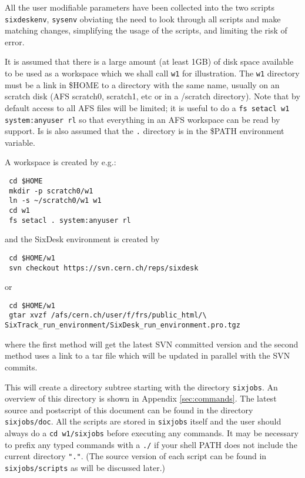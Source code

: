 \documentclass{article}    %
\begin{document}
All the user modifiable parameters have been collected into the two scripts
{\tt sixdeskenv}, {\tt sysenv} obviating the need to look through all scripts
and make matching changes, simplifying the usage of the scripts, and limiting
the risk of error.

It is assumed that there is a large amount (at least 1GB) of disk space
available to be used as a workspace which we shall call {\tt w1} for
illustration. The {\tt w1} directory must be a link in \$HOME to a directory
with the same name, usually on an scratch disk (AFS scratch0, scratch1, etc or
in a /scratch directory).  Note that by default access to all AFS files will
be limited; it is useful to do a {\tt fs setacl w1 system:anyuser rl} so that
everything in an AFS workspace can be read by support. Is is also assumed that the {\tt .} directory is in the {\$PATH} environment variable.

A workspace is created by e.g.:
\begin{verbatim}
 cd $HOME
 mkdir -p scratch0/w1
 ln -s ~/scratch0/w1 w1 
 cd w1
 fs setacl . system:anyuser rl
\end{verbatim}
and the SixDesk environment is created by 
\begin{verbatim}
 cd $HOME/w1
 svn checkout https://svn.cern.ch/reps/sixdesk
\end{verbatim}
or
\begin{verbatim}
 cd $HOME/w1
 gtar xvzf /afs/cern.ch/user/f/frs/public_html/\
SixTrack_run_environment/SixDesk_run_environment.pro.tgz
\end{verbatim}
where the first method will get the latest SVN committed version
and the second method uses a link to a tar file which will be updated 
in parallel with the SVN commits.  

This will create a directory subtree starting with
the directory {\tt sixjobs}. An overview of this directory is
shown in Appendix \ref{sec:commands}. 
The latest source and postscript of this document can be found 
in the directory {\tt sixjobs/doc}.
All the scripts are stored in {\tt sixjobs} itself
and the user should always do a
{\tt cd w1/sixjobs} before executing any commands. It may be
necessary to prefix any typed commands with a {\tt ./} if your 
shell PATH does not include the current directory {\tt "."}. 
(The source version of each script can be found
in {\tt sixjobs/scripts} as will be discussed later.)
\end{document}
